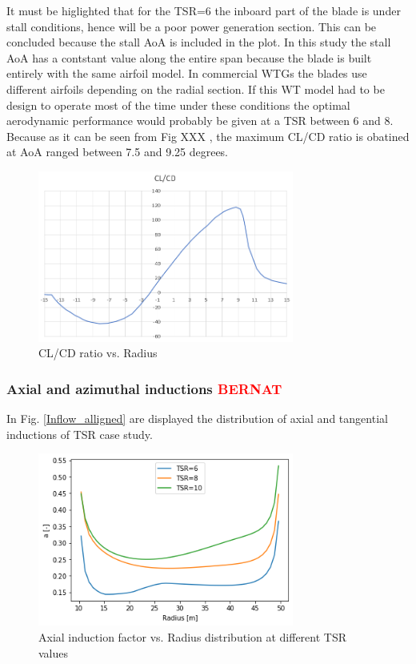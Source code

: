 It must be higlighted that for the TSR=6 the inboard part of the blade is under stall conditions, hence will be a poor power generation section. This can be concluded because the stall AoA is included in the plot. In this study the stall AoA has a contstant value along the entire span because the blade is built entirely with the same airfoil model. In commercial WTGs the blades use different airfoils depending on the radial section. If this WT model had to be design to operate most of the time under these conditions the optimal aerodynamic performance would probably be given at a TSR between 6 and 8. Because as it can be seen from Fig XXX , the maximum CL/CD ratio is obatined at AoA ranged between 7.5 and 9.25 degrees.

\begin{figure}[htbp]
\includegraphics[width=0.75\textwidth]{./img/CL_CD_plt.png}
\caption{CL/CD ratio vs. Radius }
\centering
\label{CL_CD_alligned}
\end{figure}


\subsubsection{\textbf{Axial and azimuthal inductions}  \textcolor{red}{BERNAT}}

In Fig. \ref{Inflow_alligned} are displayed the distribution of axial and tangential inductions of TSR case study. 

\begin{figure}[htbp]
\includegraphics[width=0.75\textwidth]{./img/a_plt_alligned.png}
\caption{Axial induction factor vs. Radius distribution at different TSR values}
\centering
\label{a_alligned}
\end{figure}

